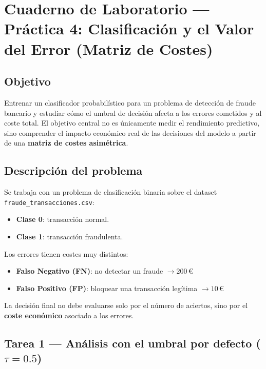 \documentclass[../../__memoria.tex]{subfiles}
\begin{document}
\standalonecover
\pagestyle{cuerpo}

\graphicspath{{\subfix{../../Imagenes/}}{../../Imagenes/}{\subfix{img/}}{img/}}

\chapter[Práctica 4: Clasificación y Matriz de Costes]{Cuaderno de Laboratorio --- Práctica 4: Clasificación y el Valor del Error (Matriz de Costes)}

\section*{Objetivo}
Entrenar un clasificador probabilístico para un problema de detección de fraude bancario y estudiar cómo el umbral de decisión afecta a los errores cometidos y al coste total. El objetivo central no es únicamente medir el rendimiento predictivo, sino comprender el impacto económico real de las decisiones del modelo a partir de una \textbf{matriz de costes asimétrica}.

\section*{Descripción del problema}
Se trabaja con un problema de clasificación binaria sobre el dataset \texttt{fraude\_transacciones.csv}:
\begin{itemize}
  \item \textbf{Clase 0}: transacción normal.
  \item \textbf{Clase 1}: transacción fraudulenta.
\end{itemize}

Los errores tienen costes muy distintos:
\begin{itemize}
  \item \textbf{Falso Negativo (FN)}: no detectar un fraude $\rightarrow 200\,\text{€}$
  \item \textbf{Falso Positivo (FP)}: bloquear una transacción legítima $\rightarrow 10\,\text{€}$
\end{itemize}

La decisión final no debe evaluarse solo por el número de aciertos, sino por el \textbf{coste económico} asociado a los errores.

\section[Tarea 1: Umbral por defecto]{Tarea 1 --- Análisis con el umbral por defecto (\texorpdfstring{$\tau = 0.5$}{tau=0.5})}
\end{document}
